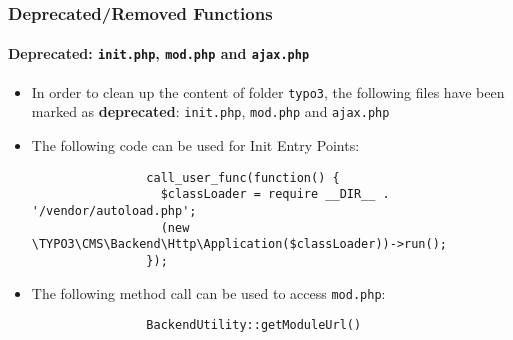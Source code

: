 \begin{frame}[fragile]
	\frametitle{Deprecated/Removed Functions}
	\framesubtitle{Deprecated: \texttt{init.php}, \texttt{mod.php} and \texttt{ajax.php}}


	\begin{itemize}

		\item In order to clean up the content of folder \texttt{typo3}, the following files have
			been marked as \textbf{deprecated}: \texttt{init.php}, \texttt{mod.php} and \texttt{ajax.php}

		\item The following code can be used for Init Entry Points:

			\begin{lstlisting}
				call_user_func(function() {
				  $classLoader = require __DIR__ . '/vendor/autoload.php';
				  (new \TYPO3\CMS\Backend\Http\Application($classLoader))->run();
				});
			\end{lstlisting}

		\item The following method call can be used to access \texttt{mod.php}:

			\begin{lstlisting}
				BackendUtility::getModuleUrl()
			\end{lstlisting}

	\end{itemize}

\end{frame}


